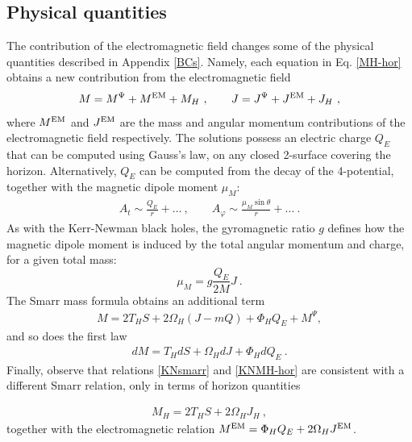 \subsection{Physical quantities}
The contribution of the electromagnetic field changes some of the physical quantities described in Appendix \ref{BCs}.
Namely, each equation in Eq. \eqref{MH-hor} obtains a new contribution from the electromagnetic field
\begin{eqnarray}
  \label{KNMH-hor}
  M=M^\Psi+M^{\rm EM}+M_H\ , \qquad J=J^\Psi+J^{\rm EM}+J_H\ ,
\end{eqnarray}
where $M^{\rm EM}$ and $J^{\rm EM}$ are the mass and angular momentum contributions of the electromagnetic field respectively.
The solutions possess an electric charge $Q_E$ that can be computed using Gauss's law, 
on any closed 2-surface covering the horizon. 
Alternatively, $Q_E$ can be computed from the decay of the 4-potential, together with the magnetic dipole moment $\mu_M$:
 \begin{eqnarray}
 \label{asym-matter-fields}
  A_t\sim 
  \frac{Q_E}{r}+\dots \ , \qquad A_{\varphi}\sim \frac{\mu_M \sin \theta}{r}+\dots\
   .
 \end{eqnarray}
As with the Kerr-Newman black holes, the gyromagnetic ratio $g$ defines how the magnetic dipole moment 
is induced by the total angular momentum and charge, for a given total mass:
\begin{equation}
  \mu_M=g\frac{Q_E}{2M}J \ .
  \label{gyro}
\end{equation}
The Smarr mass formula obtains an additional term
%
\begin{eqnarray}
  \label{KNsmarr}
  M=2 T_H S +2\Omega_H (J-m Q) + \Phi_H Q_E+ M^\Psi,
\end{eqnarray}
and so does the first law
\begin{eqnarray}
\label{first-lawKN}
dM=T_H dS +\Omega_H dJ + \Phi_H dQ_E\ .
\end{eqnarray}
Finally, observe that relations \eqref{KNsmarr} and \eqref{KNMH-hor} are consistent with a different Smarr relation, only in terms of horizon quantities  

\begin{eqnarray} 
  M_H=2T_H S+2 \Omega_H J_H~,
\end{eqnarray}
together with the electromagnetic relation $M^{\rm EM}=\Phi_HQ_E+2\Omega_HJ^{\rm EM}$.

